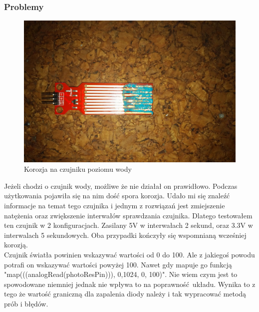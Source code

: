 \documentclass[a4paper,11pt]{uzreport}
\begin{document}
\subsubsection{Problemy}
        \begin{figure}[H]
        \centering
        \includegraphics[width=\linewidth]{listings/sniedz1.jpg}
        \caption{Korozja na czujniku poziomu wody}
        \label{fig:my_label}
    \end{figure}
    Jeżeli chodzi o czujnik wody, możliwe że nie działał on prawidłowo. Podczas użytkowania pojawiła się na nim dość spora korozja. Udało mi się znaleźć informacje na temat tego czujnika i jednym z rozwiązań jest zmiejszenie natężenia oraz zwiększenie interwałów sprawdzania czujnika. Dlatego testowałem ten czujnik w 2 konfiguracjach. Zasilany 5V w interwałach 2 sekund, oraz 3.3V w interwalach 5 sekundowych.
    Oba przypadki kończyły się wspomnianą wcześniej korozją.\\

    Czujnik światła powinien wskazywać wartości od 0 do 100. Ale z jakiegoś powodu potrafi on wskazywać wartości powyżej 100. Nawet gdy mapuje go funkcją "map(((analogRead(photoResPin))), 0,1024, 0, 100)". Nie wiem czym jest to spowodowane niemniej jednak nie wpływa to na poprawność układu. Wynika to z tego że wartość graniczną dla zapalenia diody należy i tak wypracować metodą prób i błędów. 
\end{document}
